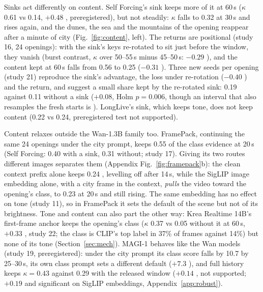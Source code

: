 Sinks act differently on content. Self Forcing's sink keeps more of it at 60\,s ($\kappa$ 0.61 vs 0.14, $+0.48$
, preregistered), but not steadily: $\kappa$ falls to 0.32 at 30\,s and rises again, and the dunes, the
sea and the mountains of the opening reappear after a minute of city (Fig.~\ref{fig:content}, left). The returns are
positional (study 16, 24 openings): with the sink's keys re-rotated to sit just before the window, they vanish (burst
contrast, $\kappa$ over 50--55\,s minus 45--50\,s: $-0.29$ ), and the content kept at 60\,s falls from 0.56 to 0.25 ($-0.31$
). Three new seeds per opening (study 21) reproduce the sink's advantage, the loss under re-rotation ($-0.40$
) and the return, and suggest a small share kept by the re-rotated sink: 0.19 against 0.11 without a
sink ($+0.08$, Holm $p=0.006$, though an interval that also resamples the fresh starts is ).
LongLive's sink, which keeps tone, does not keep content (0.22 vs 0.24, preregistered test not
supported).

Content relaxes outside the Wan-1.3B family too. FramePack, continuing the same 24 openings under the city prompt,
keeps 0.55 of the class evidence at 20\,s (Self Forcing: 0.40 with a sink, 0.31 without; study 17). Giving its two
routes different images separates them (Appendix Fig.~\ref{fig:framepack}b): the clean context prefix alone keeps 0.24
, levelling off after 14\,s, while the SigLIP image embedding alone, with a city frame in the context,
\emph{pulls} the video toward the opening's class, to 0.23  at 20\,s and still rising. The same
embedding has no effect on tone (study 11), so in FramePack it sets the default of the scene but not of its
brightness. Tone and content can also part the other way: Krea Realtime 14B's first-frame anchor keeps the
opening's class ($\kappa$ 0.37 vs 0.05 without it at 60\,s, $+0.33$ , study 22; the class is CLIP's top
label in 37\% of frames against 14\%) but none of its tone (Section~\ref{sec:mech}). MAGI-1 behaves like the Wan models (study 19, preregistered): under the city prompt its class score falls by 10.7  by 25--30\,s, its own class prompt sets a different default ($+7.3$ ), and full history keeps $\kappa=0.43$ against 0.29 with the released window ($+0.14$ , not supported; $+0.19$ and significant on SigLIP embeddings, Appendix~\ref{app:robust}).

